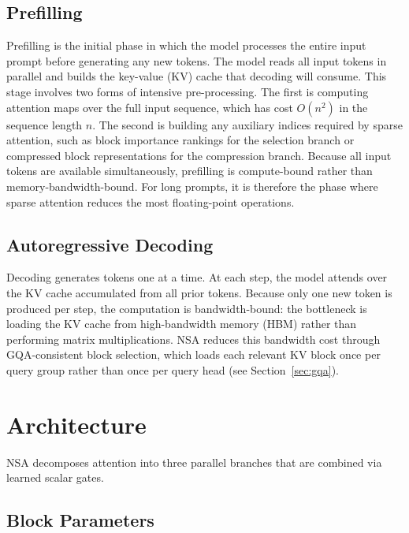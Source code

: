 \documentclass[11pt,letterpaper]{article}
\begin{document}
\subsection{Prefilling}

Prefilling is the initial phase in which the model processes the entire input prompt before
generating any new tokens. The model reads all input tokens in parallel and builds the
key-value (KV) cache that decoding will consume. This stage involves two forms of
intensive pre-processing. The first is computing attention maps over the full input sequence,
which has cost $O(n^2)$ in the sequence length $n$. The second is building any auxiliary
indices required by sparse attention, such as block importance rankings for the selection
branch or compressed block representations for the compression branch. Because all input tokens
are available simultaneously, prefilling is compute-bound rather than memory-bandwidth-bound.
For long prompts, it is therefore the phase where sparse attention reduces the most
floating-point operations.

\subsection{Autoregressive Decoding}

Decoding generates tokens one at a time. At each step, the model attends over the KV cache
accumulated from all prior tokens. Because only one new token is produced per step, the
computation is bandwidth-bound: the bottleneck is loading the KV cache from high-bandwidth
memory (HBM) rather than performing matrix multiplications. NSA reduces this bandwidth cost
through GQA-consistent block selection, which loads each relevant KV block once per query group
rather than once per query head (see Section~\ref{sec:gqa}).

\section{Architecture}

NSA decomposes attention into three parallel branches that are combined via learned scalar gates.

\subsection{Block Parameters}
\end{document}
